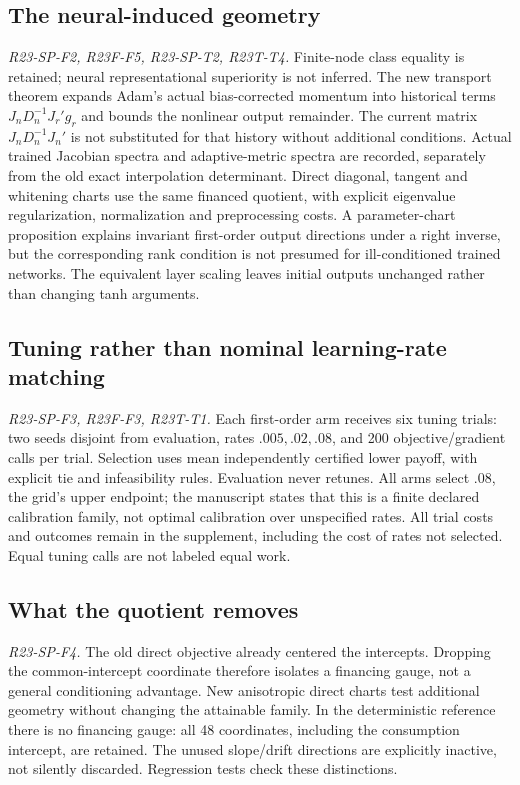 \subsection{The neural-induced geometry}
\noindent\textit{R23-SP-F2, R23F-F5, R23-SP-T2, R23T-T4.}
Finite-node class equality is retained; neural representational superiority is not inferred. The new transport theorem expands Adam's actual bias-corrected momentum into historical terms $J_nD_n^{-1}J_r'g_r$ and bounds the nonlinear output remainder. The current matrix $J_nD_n^{-1}J_n'$ is not substituted for that history without additional conditions. Actual trained Jacobian spectra and adaptive-metric spectra are recorded, separately from the old exact interpolation determinant. Direct diagonal, tangent and whitening charts use the same financed quotient, with explicit eigenvalue regularization, normalization and preprocessing costs. A parameter-chart proposition explains invariant first-order output directions under a right inverse, but the corresponding rank condition is not presumed for ill-conditioned trained networks. The equivalent layer scaling leaves initial outputs unchanged rather than changing tanh arguments.

\subsection{Tuning rather than nominal learning-rate matching}
\noindent\textit{R23-SP-F3, R23F-F3, R23T-T1.}
Each first-order arm receives six tuning trials: two seeds disjoint from evaluation, rates $.005,.02,.08$, and 200 objective/gradient calls per trial. Selection uses mean independently certified lower payoff, with explicit tie and infeasibility rules. Evaluation never retunes. All arms select $.08$, the grid's upper endpoint; the manuscript states that this is a finite declared calibration family, not optimal calibration over unspecified rates. All trial costs and outcomes remain in the supplement, including the cost of rates not selected. Equal tuning calls are not labeled equal work.

\subsection{What the quotient removes}
\noindent\textit{R23-SP-F4.}
The old direct objective already centered the intercepts. Dropping the common-intercept coordinate therefore isolates a financing gauge, not a general conditioning advantage. New anisotropic direct charts test additional geometry without changing the attainable family. In the deterministic reference there is no financing gauge: all 48 coordinates, including the consumption intercept, are retained. The unused slope/drift directions are explicitly inactive, not silently discarded. Regression tests check these distinctions.


